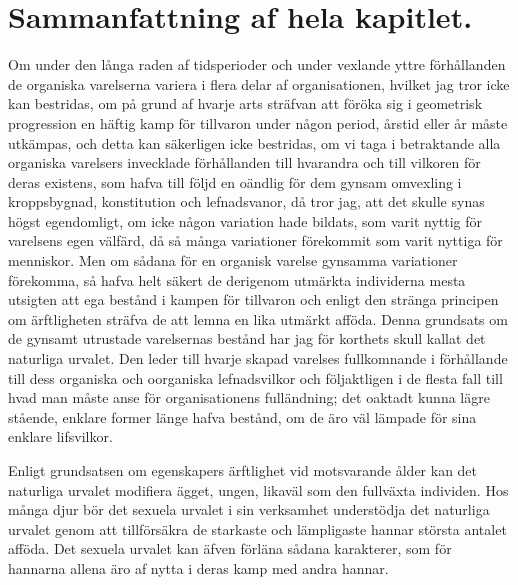 


\section{Sammanfattning af hela kapitlet.}

Om under den långa raden af tidsperioder och under vexlande yttre förhållanden de organiska varelserna variera i flera delar af organisationen, hvilket jag tror icke kan bestridas, om på grund af hvarje arts sträfvan att föröka sig i geometrisk progression en häftig kamp för tillvaron under någon period, årstid eller år måste utkämpas, och detta kan säkerligen icke bestridas, om vi taga i betraktande alla organiska varelsers invecklade förhållanden till hvarandra och till vilkoren för deras existens, som hafva till följd en oändlig för dem gynsam omvexling i kroppsbygnad, konstitution och lefnadsvanor, då tror jag, att det skulle synas högst egendomligt, om icke någon variation hade bildats, som varit nyttig för varelsens egen välfärd, då så många variationer förekommit som varit nyttiga för menniskor. Men om sådana för en organisk varelse gynsamma variationer förekomma, så hafva helt säkert de derigenom utmärkta individerna mesta utsigten att ega bestånd i kampen för tillvaron och enligt den stränga principen om ärftligheten sträfva de att lemna en lika utmärkt afföda. Denna grundsats om de gynsamt utrustade varelsernas bestånd har jag för korthets skull kallat det naturliga urvalet. Den leder till hvarje skapad varelses fullkomnande i förhållande till dess organiska och oorganiska lefnadsvilkor och följaktligen i de flesta fall till hvad man måste anse för organisationens fulländning; det oaktadt kunna lägre stående, enklare former länge hafva bestånd, om de äro väl lämpade för sina enklare lifsvilkor.

Enligt grundsatsen om egenskapers ärftlighet vid motsvarande ålder kan det naturliga urvalet modifiera ägget, ungen, likaväl som den fullväxta individen. Hos många djur bör det sexuela urvalet i sin verksamhet understödja det naturliga urvalet genom att tillförsäkra de starkaste och lämpligaste hannar största antalet afföda. Det sexuela urvalet kan äfven förläna sådana karakterer, som för hannarna allena äro af nytta i deras kamp med andra hannar.

